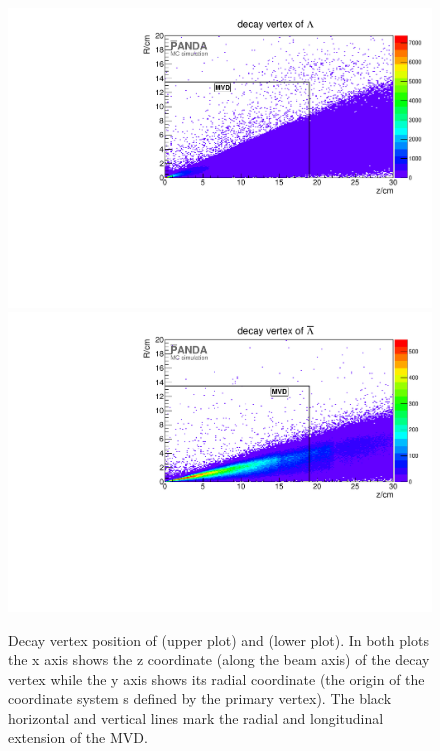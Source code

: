 		\begin{figure}
		
			\centering
			\includegraphics[width=1.\textwidth]{./plots/lambda0/lambda0_decay_vtx.pdf}
			\includegraphics[width=1.\textwidth]{./plots/antilambda0/antiLambda0_decay_vtx.pdf}
			\caption{\propose Decay vertex position of \lam (upper plot) and \alam (lower plot). 
					In both plots the x axis shows the z coordinate (along the beam axis) of the 
					decay vertex while the y axis shows its radial coordinate (the origin of the coordinate system s defined by the primary vertex).
					The black horizontal and vertical lines mark the radial and longitudinal extension of the MVD.}
			\label{fig:lambda0_antilambda0_decay_vtx}
		
		\end{figure}
		

